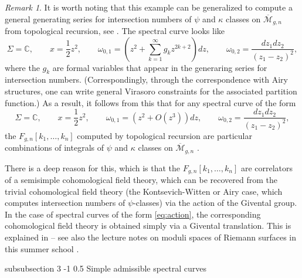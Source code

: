 \documentclass[reqno,oneside,11pt]{amsart}
\makeatletter
\theoremstyle{plain}
\theoremstyle{definition}
\theoremstyle{remark}
\newtheorem{remark}[theorem]{Remark}
\numberwithin{equation}{section}
\renewcommand{\subsubsection}{\@startsection
{subsubsection}%
{3}%
{\z@}%
{-1\baselineskip}%
{0.5\baselineskip}%
{\normalfont \it \normalsize}} %
\makeatother
\begin{document}
\begin{remark}\label{r:kappa}
It is worth noting that this example can be generalized to compute a general generating series for intersection numbers of $\psi$ and $\kappa$ classes on $\overline{\mathcal{M}}_{g,n}$ from topological recursion, see \cite{KN21}. The spectral curve looks like 
\begin{equation}
\Sigma=\mathbb{C}, \qquad x = \frac{1}{2}z^2, \qquad \omega_{0,1} =\left( z^2 + \sum_{k=1}^\infty g_k z^{2k+2} \right) dz, \qquad \omega_{0,2} = \frac{dz_1 dz_2}{(z_1-z_2)^2},
\end{equation}
where the $g_k$ are formal variables that appear in the generaring series for intersection numbers. (Correspondingly, through the correspondence with Airy structures, one can write general Virasoro constraints for the associated partition function.) As a result, it follows from this that for any spectral curve of the form 
\begin{equation}\label{eq:action}
\Sigma=\mathbb{C}, \qquad x = \frac{1}{2}z^2, \qquad \omega_{0,1} = \left(z^2 +O(z^3) \right) dz, \qquad \omega_{0,2} = \frac{dz_1 dz_2}{(z_1-z_2)^2},
\end{equation}
 the $F_{g,n}[k_1,\ldots,k_n]$ computed by topological recursion are particular combinations of integrals of $\psi$ and $\kappa$ classes on $\overline{\mathcal{M}}_{g,n}$ \cite{KN21}.
 
 There is a deep reason for this, which is that the $F_{g,n}[k_1,\ldots,k_n]$ are correlators of a semisimple cohomological field theory, which can be recovered from the trivial cohomological field theory (the Kontsevich-Witten or Airy case, which computes intersection  numbers of $\psi$-classes) via the action of the Givental group. In the case of spectral curves of the form \eqref{eq:action}, the corresponding cohomological field theory is obtained simply via a Givental translation. This is explained in \cite{DOSS12} -- see also the lecture notes on moduli spaces of Riemann surfaces in this summer school \cite{GL24}.
\end{remark}

\subsubsection{Simple admissible spectral curves}
\end{document}
